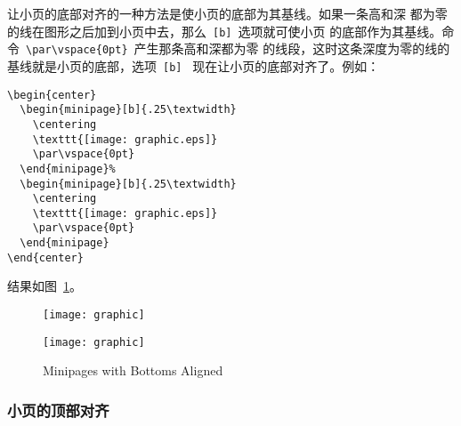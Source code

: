 让小页的底部对齐的一种方法是使小页的底部为其基线。如果一条高和深
都为零的线在图形之后加到小页中去，那么~\texttt{[b]}~选项就可使小页
的底部作为其基线。命令~\verb+\par\vspace{0pt}+~产生那条高和深都为零
的线段，这时这条深度为零的线的基线就是小页的底部，选项~\texttt{[b]}~
现在让小页的底部对齐了。例如：
\begin{Verbatim}[xleftmargin=1cm]
\begin{center}
  \begin{minipage}[b]{.25\textwidth}
    \centering
    \texttt{[image: graphic.eps]}
    \par\vspace{0pt}
  \end{minipage}%
  \begin{minipage}[b]{.25\textwidth}
    \centering
    \texttt{[image: graphic.eps]}
    \par\vspace{0pt}
  \end{minipage}
\end{center}
\end{Verbatim}
结果如图~\ref{fig:minipagesamp-2}。
\begin{figure}
\begin{center}
  \begin{minipage}[b]{.25\textwidth}
    \centering
    \texttt{[image: graphic]}
    \par\vspace{0pt}
  \end{minipage}%
  \begin{minipage}[b]{.25\textwidth}
    \centering
    \texttt{[image: graphic]}
    \par\vspace{0pt}
  \end{minipage}
\end{center}
\caption{Minipages with Bottoms Aligned}\label{fig:minipagesamp-2}
\end{figure}

\subsubsection{小页的顶部对齐}

